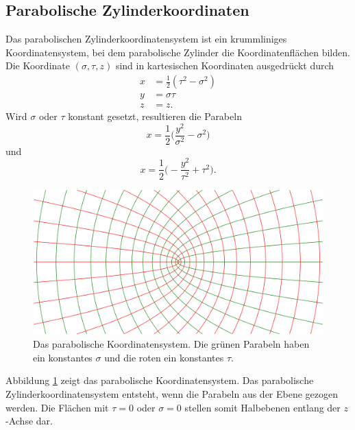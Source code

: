 \subsection{Parabolische Zylinderkoordinaten
\label{parzyl:subsection:finibus}}
Das parabolischen Zylinderkoordinatensystem \cite{parzyl:coordinates} ist ein krummliniges Koordinatensystem, 
bei dem parabolische Zylinder die Koordinatenflächen bilden.
Die Koordinate $(\sigma, \tau, z)$ sind in kartesischen Koordinaten ausgedrückt durch
\begin{align}
    x & = \frac{1}{2}(\tau^2 - \sigma^2) \\
    \label{parzyl:coordRelationsa}
    y & =  \sigma \tau\\
    z & = z.
    \label{parzyl:coordRelationse}
\end{align}
Wird $\sigma$ oder $\tau$ konstant gesetzt, resultieren die Parabeln
\begin{equation}
    x = \frac{1}{2} \biggl( \frac{y^2}{\sigma^2} - \sigma^2 \biggr)
\end{equation}
und 
\begin{equation}
    x = \frac{1}{2} \biggl( -\frac{y^2}{\tau^2} + \tau^2 \biggr).
\end{equation}

\begin{figure}
    \centering
    \includegraphics[scale=0.32]{papers/parzyl/img/coordinates.png}
    \caption{Das parabolische Koordinatensystem.
    Die grünen Parabeln haben ein 
    konstantes $\sigma$ und die roten ein konstantes $\tau$.}
    \label{parzyl:fig:cordinates}
\end{figure}
Abbildung \ref{parzyl:fig:cordinates} zeigt das parabolische Koordinatensystem.
Das parabolische Zylinderkoordinatensystem entsteht, wenn die Parabeln aus der
Ebene gezogen werden. 
Die Flächen mit $\tau = 0$ oder $\sigma = 0$ stellen somit Halbebenen entlang der $z$-Achse dar.

